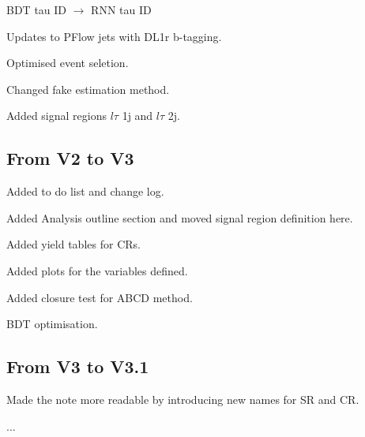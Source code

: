 BDT tau ID $\to$ RNN tau ID

Updates to PFlow jets with DL1r b-tagging.

Optimised event seletion.

Changed fake estimation method.

Added signal regions $l\tau$ 1j and $l\tau$ 2j.

\subsection{From V2 to V3}

Added to do list and change log.

Added Analysis outline section and moved signal region definition here.

Added yield tables for CRs.

Added plots for the variables defined.

Added closure test for ABCD method.

BDT optimisation.

\subsection{From V3 to V3.1}

Made the note more readable by introducing new names for SR and CR.

...
